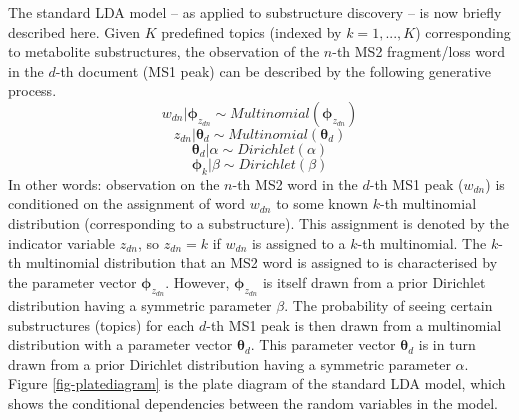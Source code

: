 The standard LDA model -- as applied to substructure discovery -- is now briefly described here. Given $K$ predefined topics (indexed by $k=1,...,K$) corresponding to metabolite substructures, the observation of the $n$-th MS2 fragment/loss word in the $d$-th document (MS1 peak) can be described by the following generative process.
\begin{equation}
w_{dn}|\boldsymbol{\phi}_{z_{dn}}\sim Multinomial(\boldsymbol{\phi}_{z_{dn}})
\end{equation}
\begin{equation}
z_{dn}|\boldsymbol{\theta}_{d}\sim Multinomial(\boldsymbol{\theta}_{d})
\end{equation}
\begin{equation}
\boldsymbol{\theta}_{d}|\alpha\sim Dirichlet(\alpha)
\end{equation}
\begin{equation}
\boldsymbol{\phi}_{k}|\beta\sim Dirichlet(\beta)
\end{equation}
In other words: observation on the $n$-th MS2 word in the $d$-th MS1 peak ($w_{dn}$) is conditioned on the assignment of word $w_{dn}$ to some known $k$-th multinomial distribution (corresponding to a substructure). This assignment is denoted by the indicator variable $z_{dn}$, so $z_{dn}=k$ if $w_{dn}$ is assigned to a $k$-th multinomial. The $k$-th multinomial distribution that an MS2 word is assigned to is characterised by the parameter vector $\boldsymbol{\phi}_{z_{dn}}$. However, $\boldsymbol{\phi}_{z_{dn}}$ is itself drawn from a prior Dirichlet distribution having a symmetric parameter $\beta$. The probability of seeing certain substructures (topics) for each $d$-th MS1 peak is then drawn from a multinomial distribution with a parameter vector $\boldsymbol{\theta}_{d}$. This parameter vector $\boldsymbol{\theta}_{d}$ is in turn drawn from a prior Dirichlet distribution having a symmetric parameter $\alpha$. Figure \ref{fig-platediagram} is the plate diagram of the standard LDA model, which shows the conditional dependencies between the random variables in the model.